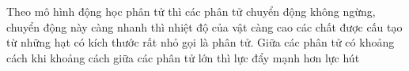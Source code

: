 \begin{ex}
	Theo mô hình động học phân tử thì
{các phân tử chuyển động không ngừng, chuyển động này càng nhanh thì nhiệt độ của vật càng cao}
{các chất được cấu tạo từ những hạt có kích thước rất nhỏ gọi là phân tử. Giữa các phân tử có khoảng cách}
{khi khoảng cách giữa các phân tử lớn thì lực đẩy mạnh hơn lực hút}
	
	\end{ex}

